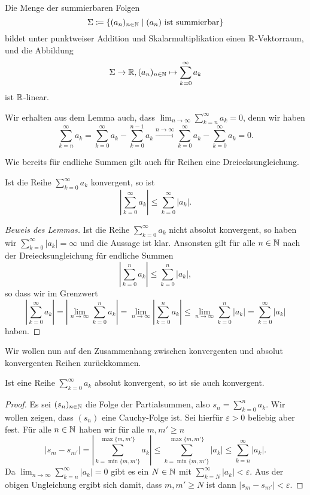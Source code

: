 \documentclass[a4paper,10pt]{article}
\begin{document}
\begin{kor}
 Die Menge der summierbaren Folgen
 \[
  \Sigma \coloneqq \{ (a_n)_{n \in \mathbb{N}} \mid \text{$(a_n)$ ist summierbar}\}
 \]
 bildet unter punktweiser Addition und Skalarmultiplikation einen $\mathbb{R}$-Vektorraum, und die Abbildung
 \[
  \Sigma \to \mathbb{R}, (a_n)_{n \in \mathbb{N}} \mapsto \sum_{k=0}^\infty a_k
 \]
 ist $\mathbb{R}$-linear.
\end{kor}


Wir erhalten aus dem Lemma auch, dass $\lim_{n \to \infty} \sum_{k=n}^\infty a_k = 0$, denn wir haben
\[
 \sum_{k=n}^\infty a_k
 = \sum_{k=0}^\infty a_k - \sum_{k=0}^{n-1} a_k
 \xrightarrow{n \to \infty} \sum_{k=0}^\infty a_k - \sum_{k=0}^\infty a_k
 = 0.
\]


Wie bereits für endliche Summen gilt auch für Reihen eine Dreiecksungleichung.


\begin{lem}
 Ist die Reihe $\sum_{k=0}^\infty a_k$ konvergent, so ist
 \[
  \left| \sum_{k=0}^\infty a_k \right| \leq \sum_{k=0}^\infty |a_k|.
 \]
\end{lem}
\begin{proof}[Beweis des Lemmas]
 Ist die Reihe $\sum_{k=0}^\infty a_k$ nicht absolut konvergent, so haben wir $\sum_{k=0}^\infty |a_k| = \infty$ und die Aussage ist klar. Ansonsten gilt für alle $n \in \mathbb{N}$ nach der Dreiecksungleichung für endliche Summen
 \[
  \left| \sum_{k=0}^n a_k \right| \leq \sum_{k=0}^n |a_k|,
 \]
 so dass wir im Grenzwert
 \[
  \left| \sum_{k=0}^\infty a_k \right|
  = \left| \lim_{n \to \infty} \sum_{k=0}^n a_k \right|
  = \lim_{n \to \infty} \left| \sum_{k=0}^n a_k \right|
  \leq \lim_{n \to \infty} \sum_{k=0}^n |a_k|
  = \sum_{k=0}^\infty |a_k|
 \]
 haben.
\end{proof}


Wir wollen nun auf den Zusammenhang zwischen konvergenten und absolut konvergenten Reihen zurückkommen.


\begin{lem}
 Ist eine Reihe $\sum_{k=0}^\infty a_k$ absolut konvergent, so ist sie auch konvergent.
\end{lem}
\begin{proof}
 Es sei $(s_n)_{n \in \mathbb{N}}$ die Folge der Partialsummen, also $s_n = \sum_{k=0}^n a_k$. Wir wollen zeigen, dass $(s_n)$ eine Cauchy-Folge ist. Sei hierfür $\varepsilon > 0$ beliebig aber fest. Für alle $n \in \mathbb{N}$ haben wir für alle $m, m' \geq n$
 \[
  |s_m - s_{m'}|
  = \left| \sum_{k=\min\{m,m'\}}^{\max\{m,m'\}} a_k \right|
  \leq \sum_{k=\min\{m,m'\}}^{\max\{m,m'\}} |a_k|
  \leq \sum_{k=n}^\infty |a_k|.
 \]
 Da $\lim_{n \to \infty} \sum_{k=n}^\infty |a_k| = 0$ gibt es ein $N \in \mathbb{N}$ mit $\sum_{k=N}^\infty |a_k| < \varepsilon$. Aus der obigen Ungleichung ergibt sich damit, dass $m, m' \geq N$ ist dann $|s_m - s_{m'}| < \varepsilon$.
\end{proof}
\end{document}

